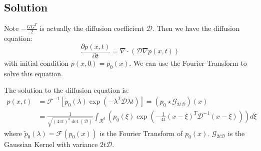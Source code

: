 \subsection{Solution}
Note $-\frac{GG^T}{2}$ is actually the diffusion coefficient $\mathcal{D}$. Then we have the diffusion equation:
\begin{equation}
    \frac{\partial p(x, t)}{\partial t} = \nabla \cdot\left(\mathcal{D}\nabla p(x, t)\right)
\end{equation}
with initial condition $p(x, 0) = p_0(x)$. We can use the Fourier Transform to solve this equation. 
\begin{theorem}
    The solution to the diffusion equation is:
    \begin{equation}
        \begin{aligned}
            p(x, t) &= \mathscr{F}^{-1}\left[\tilde{p}_0(\lambda)\exp\left(-\lambda^T\mathcal{D}\lambda t\right)\right]=\left(p_0\star \mathcal{G}_{2t\mathcal{D}}\right)(x)\\
            & = \frac{1}{\sqrt{(4\pi t)^d\det(\mathcal{D})}}\int_{\mathcal{R}^d}\left(p_0(\xi)\exp\left(-\frac{1}{4t}\left(x-\xi\right)^T\mathcal{D}^{-1}\left(x-\xi\right)\right)\right)d\xi
        \end{aligned}
    \end{equation}
    where $\tilde{p}_0(\lambda) = \mathscr{F}(p_0(x))$ is the Fourier Transform of $p_0(x)$. $\mathcal{G}_{2t\mathcal{D}}$ is the Gaussian Kernel with variance $2t\mathcal{D}$.
\end{theorem}
